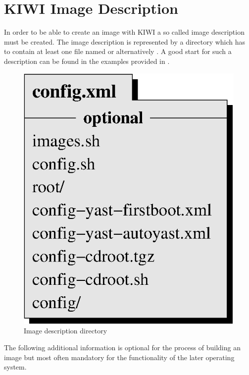 \chapter{KIWI Image Description}
\label{chapter:description}
\minitoc

In order to be able to create an image with KIWI a so called
image description must be created. The image description is
represented by a directory which has to contain at least one
file named  or alternatively .
A good start for such a description can be found in the examples
provided in .

\begin{figure}[h]
\centering
\includegraphics[scale=0.5]{pictures/description.eps}
\caption{Image description directory}
\label{fig:description}
\end{figure}

The following additional information is optional for the process
of building an image but most often mandatory for the functionality
of the later operating system.

